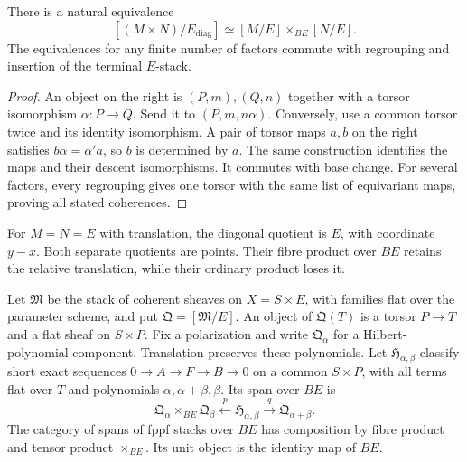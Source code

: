 \begin{proposition}
\label{igusa:platonic-common-torsor}
There is a natural equivalence
\[
 [(M\times N)/E_{\mathrm{diag}}]
 \simeq[M/E]\times_{BE}[N/E].
\]
The equivalences for any finite number of factors commute with
regrouping and insertion of the terminal \(E\)-stack.
\end{proposition}
\begin{proof}
An object on the right is \((P,m),(Q,n)\) together with a
torsor isomorphism \(\alpha:P\to Q\). Send it to
\((P,m,n\alpha)\). Conversely, use a common torsor twice
and its identity isomorphism. A pair of torsor maps \(a,b\)
on the right satisfies \(b\alpha=\alpha'a\), so \(b\)
is determined by \(a\). The same construction identifies the
maps and their descent isomorphisms. It commutes with base change.
For several factors, every regrouping gives one torsor with the
same list of equivariant maps, proving all stated coherences.
\end{proof}

For \(M=N=E\) with translation, the diagonal quotient is
\(E\), with coordinate \(y-x\). Both separate quotients
are points. Their fibre product over \(BE\) retains the
relative translation, while their ordinary product loses it.

Let \(\mathfrak M\) be the stack of coherent sheaves on
\(X=S\times E\), with families flat over the parameter
scheme, and put \(\mathfrak Q=[\mathfrak M/E]\).
An object of \(\mathfrak Q(T)\) is a torsor \(P\to T\)
and a flat sheaf on \(S\times P\). Fix a polarization and
write \(\mathfrak Q_\alpha\) for a Hilbert-polynomial component.
Translation preserves these polynomials. Let
\(\mathfrak H_{\alpha,\beta}\) classify short exact sequences
\(0\to A\to F\to B\to0\) on a common \(S\times P\),
with all terms flat over \(T\) and polynomials
\(\alpha,\alpha+\beta,\beta\). Its span over \(BE\) is
\[
 \mathfrak Q_\alpha\times_{BE}\mathfrak Q_\beta
 \xleftarrow{p}\mathfrak H_{\alpha,\beta}
 \xrightarrow{q}\mathfrak Q_{\alpha+\beta}.
\]
The category of spans of fppf stacks over \(BE\) has composition
by fibre product and tensor product \(\times_{BE}\). Its unit
object is the identity map of \(BE\).

